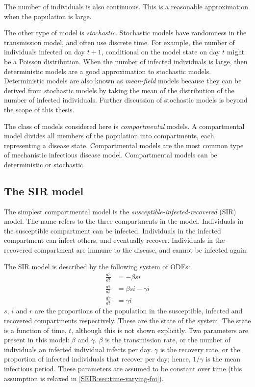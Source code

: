 \documentclass[thesis.tex]{subfiles}
\begin{document}
The number of individuals is also continuous.
This is a reasonable approximation when the population is large.

The other type of model is \emph{stochastic}.
Stochastic models have randomness in the transmission model, and often use discrete time.
For example, the number of individuals infected on day $t+1$, conditional on the model state on day $t$ might be a Poisson distribution.
When the number of infected individuals is large, then deterministic models are a good approximation to stochastic models.
Deterministic models are also known as \emph{mean-field} models because they can be derived from stochastic models by taking the mean of the distribution of the number of infected individuals.
Further discussion of stochastic models is beyond the scope of this thesis.

The class of models considered here is \emph{compartmental} models.
A compartmental model divides all members of the population into compartments, each representing a disease state.
Compartmental models are the most common type of mechanistic infectious disease model.
Compartmental models can be deterministic or stochastic.

\subsection{The SIR model}

The simplest compartmental model is the \emph{susceptible-infected-recovered} (SIR) model.
The name refers to the three compartments in the model.
Individuals in the susceptible compartment can be infected.
Individuals in the infected compartment can infect others, and eventually recover.
Individuals in the recovered compartment are immune to the disease, and cannot be infected again.

The SIR model is described by the following system of ODEs:
\begin{align}
\frac{ds}{dt} &= -\beta si \\
\frac{di}{dt} &= \beta si - \gamma i \\
\frac{dr}{dt} &= \gamma i
\end{align}
$s$, $i$ and $r$ are the proportions of the population in the susceptible, infected and recovered compartments respectively.
These are the state of the system.
The state is a function of time, $t$, although this is not shown explicitly.
Two parameters are present in this model: $\beta$ and $\gamma$.
$\beta$ is the transmission rate, or the number of individuals an infected individual infects per day.
$\gamma$ is the recovery rate, or the proportion of infected individuals that recover per day; hence, $1/\gamma$ is the mean infectious period.
These parameters are assumed to be constant over time (this assumption is relaxed in \cref{SEIR:sec:time-varying-foi}).
\end{document}
